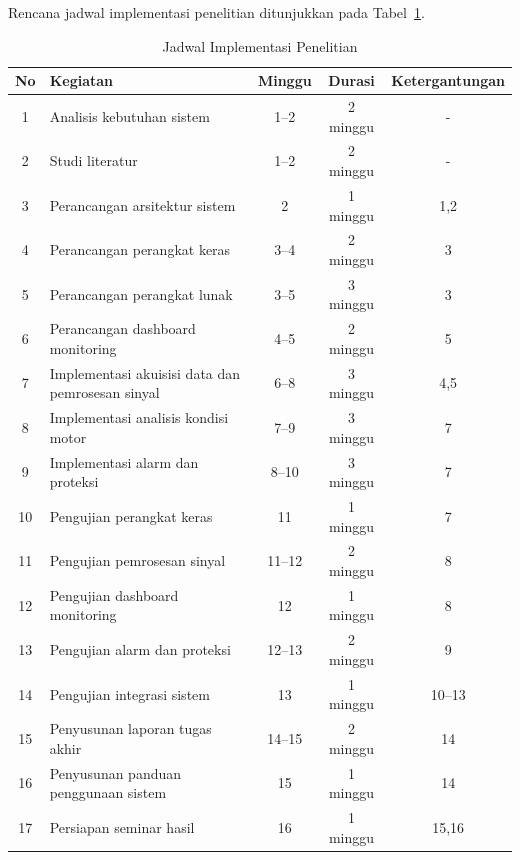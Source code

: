 \documentclass{elsinta}
\begin{document}
Rencana jadwal implementasi penelitian ditunjukkan pada Tabel~\ref{tab:jadwal}.



\begin{table}[H]
\centering
\caption{Jadwal Implementasi Penelitian}
\label{tab:jadwal}
\renewcommand{\arraystretch}{1.3}
\begin{tabular}{|c|p{7cm}|c|c|c|}
\hline
No & Kegiatan & Minggu & Durasi & Ketergantungan\\
\hline

1 & Analisis kebutuhan sistem & 1--2 & 2 minggu & -\\
\hline

2 & Studi literatur & 1--2 & 2 minggu & -\\
\hline

3 & Perancangan arsitektur sistem & 2 & 1 minggu & 1,2\\
\hline

4 & Perancangan perangkat keras & 3--4 & 2 minggu & 3\\
\hline

5 & Perancangan perangkat lunak & 3--5 & 3 minggu & 3\\
\hline

6 & Perancangan dashboard monitoring & 4--5 & 2 minggu & 5\\
\hline

7 & Implementasi akuisisi data dan pemrosesan sinyal & 6--8 & 3 minggu & 4,5\\
\hline

8 & Implementasi analisis kondisi motor & 7--9 & 3 minggu & 7\\
\hline

9 & Implementasi alarm dan proteksi & 8--10 & 3 minggu & 7\\
\hline

10 & Pengujian perangkat keras & 11 & 1 minggu & 7\\
\hline

11 & Pengujian pemrosesan sinyal & 11--12 & 2 minggu & 8\\
\hline

12 & Pengujian dashboard monitoring & 12 & 1 minggu & 8\\
\hline

13 & Pengujian alarm dan proteksi & 12--13 & 2 minggu & 9\\
\hline

14 & Pengujian integrasi sistem & 13 & 1 minggu & 10--13\\
\hline

15 & Penyusunan laporan tugas akhir & 14--15 & 2 minggu & 14\\
\hline

16 & Penyusunan panduan penggunaan sistem & 15 & 1 minggu & 14\\
\hline

17 & Persiapan seminar hasil & 16 & 1 minggu & 15,16\\
\hline

\end{tabular}
\end{table}
\end{document}
